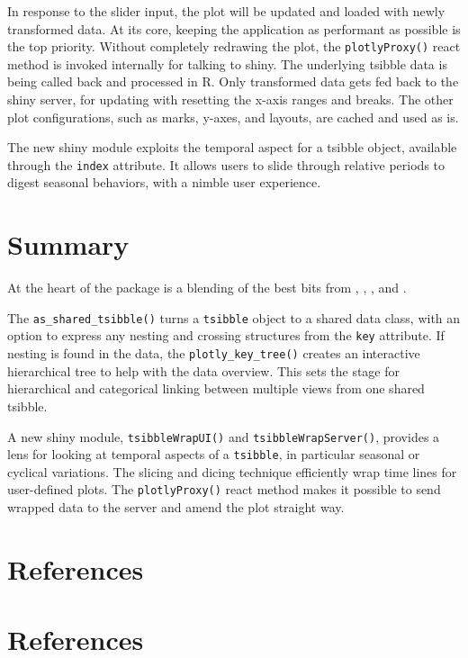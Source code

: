 In response to the slider input, the plot will be updated and loaded with newly transformed data. At its core, keeping the application as performant as possible is the top priority. Without completely redrawing the plot, the \texttt{plotlyProxy()} react method is invoked internally for talking to shiny. The underlying tsibble data is being called back and processed in R. Only transformed data gets fed back to the shiny server, for updating with resetting the x-axis ranges and breaks. The other plot configurations, such as marks, y-axes, and layouts, are cached and used as is.

The new shiny module exploits the temporal aspect for a tsibble object, available through the \texttt{index} attribute. It allows users to slide through relative periods to digest seasonal behaviors, with a nimble user experience.

\hypertarget{summary}{%
\section{Summary}\label{summary}}

At the heart of the  package is a blending of the best bits from , , , and .

The \texttt{as\_shared\_tsibble()} turns a \texttt{tsibble} object to a shared data class, with an option to express any nesting and crossing structures from the \texttt{key} attribute. If nesting is found in the data, the \texttt{plotly\_key\_tree()} creates an interactive hierarchical tree to help with the data overview. This sets the stage for hierarchical and categorical linking between multiple views from one shared tsibble.

A new shiny module, \texttt{tsibbleWrapUI()} and \texttt{tsibbleWrapServer()}, provides a lens for looking at temporal aspects of a \texttt{tsibble}, in particular seasonal or cyclical variations. The slicing and dicing technique efficiently wrap time lines for user-defined plots. The \texttt{plotlyProxy()} react method makes it possible to send wrapped data to the server and amend the plot straight way.

\hypertarget{references}{%
\section{References}\label{references}}

\hypertarget{references-1}{%
\section*{References}\label{references-1}}

